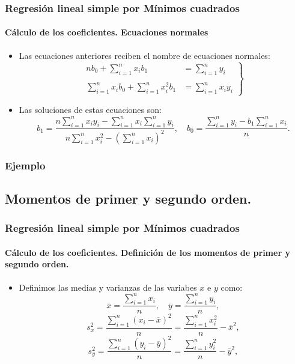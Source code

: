 \begin{frame}
\frametitle{Regresión lineal simple por Mínimos cuadrados}
\framesubtitle{Cálculo de los coeficientes. Ecuaciones normales}

\begin{itemize}
\item<2->{Las ecuaciones anteriores reciben el nombre de 
ecuaciones normales:
$$
\left.
\begin{array}{ll}n b_0 + \sum\limits_{i=1}^n x_i b_1&=\sum\limits_{i=1}^n y_i\\ & \\
\sum\limits_{i=1}^n x_i b_0 + \sum\limits_{i=1}^n x_i^2 b_1 &=\sum\limits_{i=1}^n x_i
y_i
\end{array}\right\}
$$}
\item<3->{Las soluciones de estas ecuaciones son:
$$b_1=\frac{n \sum\limits_{i=1}^n x_i y_i-\sum\limits_{i=1}^n x_i\sum\limits_{i=1}^n y_i} {n\sum\limits_{i=1}^n
x_i^2-(\sum\limits_{i=1}^n x_i)^2},\quad b_0=\frac{\sum\limits_{i=1}^n y_i -b_1 \sum\limits_{i=1}^n x_i}{n}.$$}
\end{itemize}
\end{frame}

\begin{frame}
\frametitle{Ejemplo}
\end{frame}

\subsection{Momentos de primer y segundo orden.}
\begin{frame}
\frametitle{Regresión lineal simple por Mínimos cuadrados}
\framesubtitle{Cálculo de los coeficientes. Definición de los momentos de primer y segundo orden.}
\begin{itemize}
\item<2->{Definimos las medias y varianzas de las variabes $x$ e $y$ como:
$$
\overline{x}=\frac{\sum\limits_{i=1}^n x_i}{n},\quad \overline{y}=\frac{\sum\limits_{i=1}^n y_i}{n},
$$
$$
s_x^2 =\frac{\sum\limits_{i=1}^n (x_i-\overline{x})^2}{n}=\frac{\sum\limits_{i=1}^n x_i^2}{n}-\overline{x}^2,$$
$$s_y^2 =\frac{\sum\limits_{i=1}^n (y_i-\overline{y})^2}{n}=\frac{\sum\limits_{i=1}^n y_i^2}{n}-\overline{y}^2,
$$}
\end{itemize}
\end{frame}


